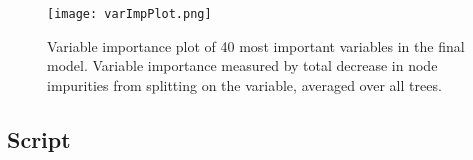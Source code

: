 \documentclass{scrartcl}
\begin{document}
\begin{figure}
    \centering
    \texttt{[image: varImpPlot.png]}
    \caption{Variable importance plot of 40 most important variables in the final model. Variable importance measured by total decrease in node impurities from splitting on the variable, averaged over all trees.}
    \label{fig:varimp}
\end{figure}

\pagebreak

\clearpage

\subsection*{Script}

\inputminted{R}{final_final.R}
\end{document}
